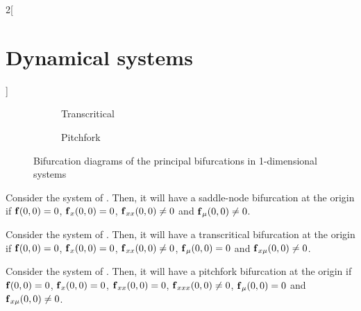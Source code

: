 \documentclass[../../../main_math.tex]{subfiles}
\begin{document}
\begin{multicols}{2}[\section{Dynamical systems}]
\begin{figure}[H]
\begin{subfigure}[b]{0.32\linewidth}
      \label{DS:sn}
    \end{subfigure}
    \hfill
    \begin{subfigure}[b]{0.32\linewidth}
      \centering
      
      \caption{Transcritical}
      \label{DS:trans}
    \end{subfigure}
    \hfill
    \begin{subfigure}[b]{0.32\linewidth}
      \centering
      
      \caption{Pitchfork}
      \label{DS:fork}
    \end{subfigure}
    \caption{Bifurcation diagrams of the principal bifurcations in 1-dimensional systems}
  \end{figure}
  \begin{theorem}
    Consider the system of . Then, it will have a saddle-node bifurcation at the origin if $\boldsymbol{\mathrm{f}}(0,0)=0$, $\boldsymbol{\mathrm{f}}_x(0,0)=0$, $\boldsymbol{\mathrm{f}}_{xx}(0,0)\ne 0$ and $\boldsymbol{\mathrm{f}}_\mu(0,0)\ne0$.
  \end{theorem}
  \begin{theorem}
    Consider the system of . Then, it will have a transcritical bifurcation at the origin if $\boldsymbol{\mathrm{f}}(0,0)=0$, $\boldsymbol{\mathrm{f}}_x(0,0)=0$, $\boldsymbol{\mathrm{f}}_{xx}(0,0)\ne 0$, $\boldsymbol{\mathrm{f}}_\mu(0,0)=0$ and $\boldsymbol{\mathrm{f}}_{x\mu}(0,0)\ne 0$.
  \end{theorem}
  \begin{theorem}
    Consider the system of . Then, it will have a pitchfork bifurcation at the origin if $\boldsymbol{\mathrm{f}}(0,0)=0$, $\boldsymbol{\mathrm{f}}_x(0,0)=0$, $\boldsymbol{\mathrm{f}}_{xx}(0,0)=0$, $\boldsymbol{\mathrm{f}}_{xxx}(0,0)\ne 0$, $\boldsymbol{\mathrm{f}}_\mu(0,0)=0$ and $\boldsymbol{\mathrm{f}}_{x\mu}(0,0)\ne 0$.
  \end{theorem}

\end{multicols}
\end{document}
